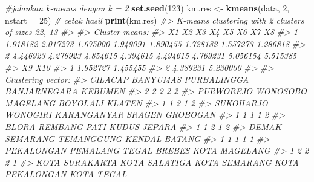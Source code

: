 \documentclass[
  oneside]{book}
\newenvironment{Shaded}{\begin{snugshade}}{\end{snugshade}}
\newcommand{\AttributeTok}[1]{\textcolor[rgb]{0.13,0.29,0.53}{#1}}
\newcommand{\CommentTok}[1]{\textcolor[rgb]{0.56,0.35,0.01}{\textit{#1}}}
\newcommand{\DecValTok}[1]{\textcolor[rgb]{0.00,0.00,0.81}{#1}}
\newcommand{\FunctionTok}[1]{\textcolor[rgb]{0.13,0.29,0.53}{\textbf{#1}}}
\newcommand{\NormalTok}[1]{#1}
\newcommand{\OtherTok}[1]{\textcolor[rgb]{0.56,0.35,0.01}{#1}}
\begin{document}
\begin{Shaded}
\begin{Highlighting}[]
\CommentTok{\#jalankan k{-}means dengan k = 2}
\FunctionTok{set.seed}\NormalTok{(}\DecValTok{123}\NormalTok{)}
\NormalTok{km.res }\OtherTok{\textless{}{-}} \FunctionTok{kmeans}\NormalTok{(data, }\DecValTok{2}\NormalTok{, }\AttributeTok{nstart =} \DecValTok{25}\NormalTok{)}
\CommentTok{\# cetak hasil}
\FunctionTok{print}\NormalTok{(km.res)}
\CommentTok{\#\textgreater{} K{-}means clustering with 2 clusters of sizes 22, 13}
\CommentTok{\#\textgreater{} }
\CommentTok{\#\textgreater{} Cluster means:}
\CommentTok{\#\textgreater{}         X1       X2       X3       X4       X5       X6       X7       X8}
\CommentTok{\#\textgreater{} 1 1.918182 2.017273 1.675000 1.949091 1.890455 1.728182 1.557273 1.286818}
\CommentTok{\#\textgreater{} 2 4.446923 4.276923 4.854615 4.394615 4.494615 4.769231 5.056154 5.515385}
\CommentTok{\#\textgreater{}         X9      X10}
\CommentTok{\#\textgreater{} 1 1.952727 1.455455}
\CommentTok{\#\textgreater{} 2 4.389231 5.230000}
\CommentTok{\#\textgreater{} }
\CommentTok{\#\textgreater{} Clustering vector:}
\CommentTok{\#\textgreater{}         CILACAP        BANYUMAS     PURBALINGGA    BANJARNEGARA         KEBUMEN }
\CommentTok{\#\textgreater{}               2               2               2               2               2 }
\CommentTok{\#\textgreater{}       PURWOREJO        WONOSOBO        MAGELANG        BOYOLALI          KLATEN }
\CommentTok{\#\textgreater{}               1               1               2               1               2 }
\CommentTok{\#\textgreater{}       SUKOHARJO        WONOGIRI     KARANGANYAR          SRAGEN        GROBOGAN }
\CommentTok{\#\textgreater{}               1               1               1               1               2 }
\CommentTok{\#\textgreater{}           BLORA         REMBANG            PATI           KUDUS          JEPARA }
\CommentTok{\#\textgreater{}               1               1               2               1               2 }
\CommentTok{\#\textgreater{}         DEMAK          SEMARANG      TEMANGGUNG          KENDAL          BATANG }
\CommentTok{\#\textgreater{}               1               1               1               1               1 }
\CommentTok{\#\textgreater{}      PEKALONGAN        PEMALANG           TEGAL          BREBES   KOTA MAGELANG }
\CommentTok{\#\textgreater{}               1               2               2               2               1 }
\CommentTok{\#\textgreater{}  KOTA SURAKARTA   KOTA SALATIGA   KOTA SEMARANG KOTA PEKALONGAN      KOTA TEGAL }

\end{Highlighting}
\end{Shaded}
\end{document}
